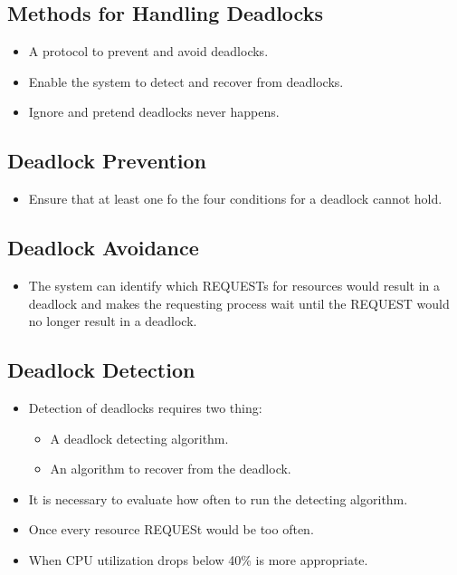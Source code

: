 \documentclass[a4wide,10pt]{article}
\begin{document}
\subsection{Methods for Handling Deadlocks} %
\label{sub:methods_for_handling_deadlocks}
\begin{itemize}
	\item A protocol to prevent and avoid deadlocks.
	\item Enable the system to detect and recover from deadlocks.
	\item Ignore and pretend deadlocks never happens.
\end{itemize}

\subsection{Deadlock Prevention} %
\label{sub:deadlock_prevention}
\begin{itemize}
	\item Ensure that at least one fo the four conditions for a deadlock cannot hold.
\end{itemize}

\subsection{Deadlock Avoidance} %
\label{sub:deadlock_avoidance}
\begin{itemize}
	\item The system can identify which REQUESTs for resources would result in a deadlock and makes the requesting process wait until the REQUEST would no longer result in a deadlock.
\end{itemize}

\subsection{Deadlock Detection} %
\label{sub:deadlock_detection}
\begin{itemize}
	\item Detection of deadlocks requires two thing:
	\begin{itemize}
		\item A deadlock detecting algorithm.
		\item An algorithm to recover from the deadlock.
	\end{itemize}
	\item It is necessary to evaluate how often to run the detecting algorithm.
	\item Once every resource REQUESt would be too often.
	\item When CPU utilization drops below 40\% is more appropriate.
\end{itemize}
\end{document}
